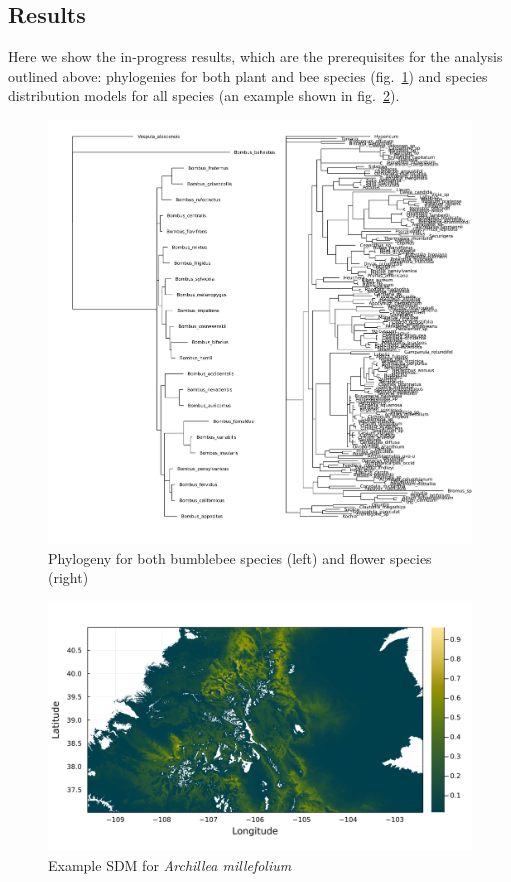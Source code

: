 \documentclass[10pt,oneside]{article}
\makeatletter
\def\maxwidth{\ifdim\Gin@nat@width>\linewidth\linewidth
\else\Gin@nat@width\fi}
\let\Oldincludegraphics\includegraphics
\renewcommand{\includegraphics}[1]{\Oldincludegraphics[width=\maxwidth]{#1}}
\makeatother
\begin{document}
\hypertarget{results-1}{%
\subsection{Results}\label{results-1}}

Here we show the in-progress results, which are the prerequisites for
the analysis outlined above: phylogenies for both plant and bee species
(fig.~\ref{fig:phylo}) and species distribution models for all species
(an example shown in fig.~\ref{fig:example_sdm}).

\begin{figure}
\hypertarget{fig:phylo}{%
\centering
\includegraphics{./figures/trees.png}
\caption{Phylogeny for both bumblebee species (left) and flower species
(right)}\label{fig:phylo}
}
\end{figure}

\begin{figure}
\hypertarget{fig:example_sdm}{%
\centering
\includegraphics{./figures/sample_sdm.png}
\caption{Example SDM for \emph{Archillea
millefolium}}\label{fig:example_sdm}
}
\end{figure}
\end{document}
